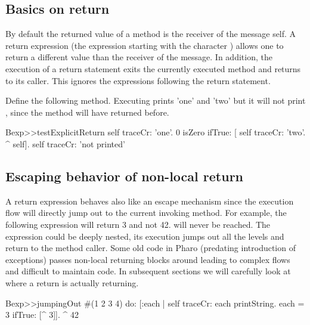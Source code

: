 \documentclass[a4paper,10pt,twoside]{book}
\begin{document}
\subsection{Basics on return}

By default the returned value of a method is the receiver of the message \ie self.
A return expression (the expression starting with the character \ct{^}) allows one to return a different value than the receiver of the message. In addition, the execution of a return statement exits the currently executed method and returns to its caller. This ignores the expressions following the return statement.

Define the following method. Executing   prints 'one' and 'two' but it will not print , since the method  will have returned before.

\begin{code}{}
Bexp>>testExplicitReturn
	self traceCr: 'one'.
	0 isZero ifTrue: [ self traceCr: 'two'. ^ self].
	self traceCr: 'not printed'
\end{code}


%
%


\subsection{Escaping behavior of non-local return}
A return expression behaves also like an escape mechanism since the execution flow will directly jump out to the current invoking method. For example, the following expression  will return 3 and not 42.  will never be reached. The expression \ct{[ ^3 ]} could be deeply nested, its execution jumps out all the levels and return to the method caller. Some old code  in Pharo (predating introduction of exceptions) passes non-local returning blocks around leading to complex flows and difficult to maintain code. In subsequent sections we will carefully look at where a return is actually returning.

\begin{code}{}
Bexp>>jumpingOut
	#(1 2 3 4) do: [:each |
					self traceCr: each printString.
					each = 3
						ifTrue: [^ 3]].
	^ 42
\end{code}
\end{document}
